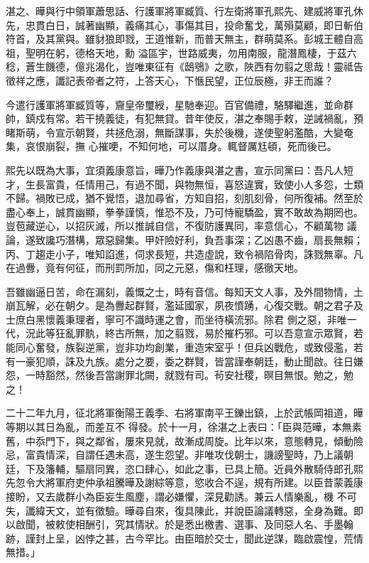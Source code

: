 \begin{pinyinscope}
 湛之、曄與行中領軍蕭思話、行護軍將軍臧質、行左衛將軍孔熙先、建威將軍孔休先，忠貫白日，誠著幽顯，義痛其心，事傷其目，投命奮戈，萬殞莫顧，即日斬伯符首，及其黨與。雖豺狼即戮，王道惟新，而普天無主，群萌莫系。彭城王體自高祖，聖明在躬，德格天地，勳
 溢區宇，世路威夷，勿用南服，龍潛鳳棲，于茲六稔，蒼生饑德，億兆渴化，豈唯東征有《鴟鴞》之歌，陜西有勿翦之思哉！靈祗告徵祥之應，讖記表帝者之符，上答天心，下愜民望，正位辰極，非王而誰？



 今遣行護軍將軍臧質等，齎皇帝璽綬，星馳奉迎。百官備禮，駱驛繼進，並命群帥，鎮戍有常。若干撓義徒，有犯無貸。昔年使反，湛之奉賜手敕，逆誡禍亂，預睹斯萌，令宣示朝賢，共拯危溺，無斷謀事，失於後機，遂使聖躬濫酷，大變奄集，哀恨崩裂，撫
 心摧哽，不知何地，可以厝身。輒督厲尪頓，死而後已。



 熙先以既為大事，宜須義康意旨，曄乃作義康與湛之書，宣示同黨曰：吾凡人短才，生長富貴，任情用己，有過不聞，與物無恒，喜怒違實，致使小人多怨，士類不歸。禍敗已成，猶不覺悟，退加尋省，方知自招，刻肌刻骨，何所復補。然至於盡心奉上，誠貫幽顯，拳拳謹慎，惟恐不及，乃可恃寵驕盈，實不敢故為期罔也。豈苞藏逆心，以招灰滅，所以推誠自信，不復防護異同，率意信心，不顧萬物
 議論，遂致讒巧潛構，眾惡歸集。甲奸險好利，負吾事深；乙凶愚不齒，扇長無賴；丙、丁趨走小子，唯知諂進，伺求長短，共造虛說，致令禍陷骨肉，誅戮無辜。凡在過釁，竟有何征，而刑罰所加，同之元惡，傷和枉理，感徹天地。



 吾雖幽逼日苦，命在漏刻，義慨之士，時有音信。每知天文人事，及外間物情，土崩瓦解，必在朝夕。是為釁起群賢，濫延國家，夙夜憤踴，心復交戰。朝之君子及士庶白黑懷義秉理者，寧可不識時運之會，而坐待橫流邪。除君
 側之惡，非唯一代，況此等狂亂罪骫，終古所無，加之翦戮，易於摧朽邪。可以吾意宣示眾賢，若能同心奮發，族裂逆黨，豈非功均創業，重造宋室乎！但兵凶戰危，或致侵濫，若有一豪犯順，誅及九族。處分之要，委之群賢，皆當謹奉朝廷，動止聞啟。往日嫌怨，一時豁然，然後吾當謝罪北闕，就戮有司。茍安社稷，暝目無恨。勉之，勉之！



 二十二年九月，征北將軍衡陽王義季、右將軍南平王鑠出鎮，上於武帳岡祖道，曄等期以其日為亂，而差互不
 得發。於十一月，徐湛之上表曰：「臣與范曄，本無素舊，中忝門下，與之鄰省，屢來見就，故漸成周旋。比年以來，意態轉見，傾動險忌，富貴情深，自謂任遇未高，遂生怨望。非唯攻伐朝士，譏謗聖時，乃上議朝廷，下及籓輔，驅扇同異，恣口肆心，如此之事，已具上簡。近員外散騎侍郎孔熙先忽令大將軍府吏仲承祖騰曄及謝綜等意，慾收合不逞，規有所建。以臣昔蒙義康接盼，又去歲群小為臣妄生風塵，謂必嫌懼，深見勸誘。兼云人情樂亂，機
 不可失，讖緯天文，並有徵驗。曄尋自來，復具陳此，并說臣論議轉惡，全身為難。即以啟聞，被敕使相酬引，究其情狀。於是悉出檄書、選事、及同惡人名、手墨翰跡，謹封上呈，凶悖之甚，古今罕比。由臣暗於交士，聞此逆謀，臨啟震惶，荒情無措。」




\end{pinyinscope}
